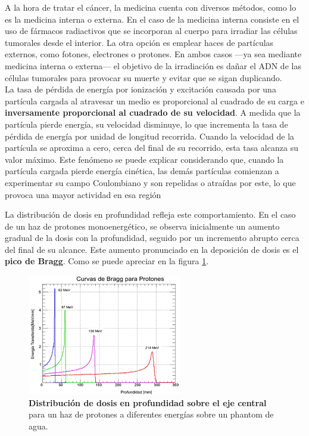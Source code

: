 \documentclass[onecolumn,12pt]{article} %
\begin{document}
A la hora de tratar el cáncer, la medicina cuenta con diversos métodos, como lo es la medicina  interna o externa. En el caso de la medicina interna  consiste en el uso de fármacos radiactivos que se incorporan al cuerpo para irradiar las células tumorales desde el interior. La otra opción es emplear haces de partículas externos, como fotones, electrones o protones. En ambos casos —ya sea mediante medicina interna o externa— el objetivo de la irradiación es dañar el ADN de las células tumorales para provocar su muerte y evitar que se sigan duplicando.\cite{Podgorsak2005}
 \\




La tasa de pérdida de energía por ionización y excitación causada por una partícula cargada al atravesar un medio es proporcional al cuadrado de su carga e \textbf{inversamente proporcional al cuadrado de su velocidad}. A medida que la partícula pierde energía, su velocidad disminuye, lo que incrementa la tasa de pérdida de energía por unidad de longitud recorrida. Cuando la velocidad de la partícula se aproxima a cero, cerca del final de su recorrido, esta tasa alcanza su valor máximo.  Este fenómeno se puede explicar considerando que, cuando la partícula cargada pierde energía cinética, las demás partículas comienzan a experimentar  su campo Coulombiano y son repelidas o atraídas por este, lo que provoca una mayor actividad en esa región \cite{khan}

La distribución de dosis en profundidad refleja este comportamiento. En el caso de un haz de protones monoenergético, se observa inicialmente un aumento gradual de la dosis con la profundidad, seguido por un incremento abrupto cerca del final de su alcance. Este aumento pronunciado en la deposición de dosis es  el \textbf{pico de Bragg}. Como se puede apreciar en la figura \ref{fig:bragg_peak}. 
\begin{figure}[H]
    \centering
    \includegraphics[width=0.6\textwidth]{img_intro/picoBragg.png}
    \caption{\textbf{Distribución de dosis en profundidad sobre el eje central} para un haz de protones a diferentes energías sobre un phantom de agua.\cite{unal2014}}
    \label{fig:bragg_peak}
\end{figure}
\end{document}
